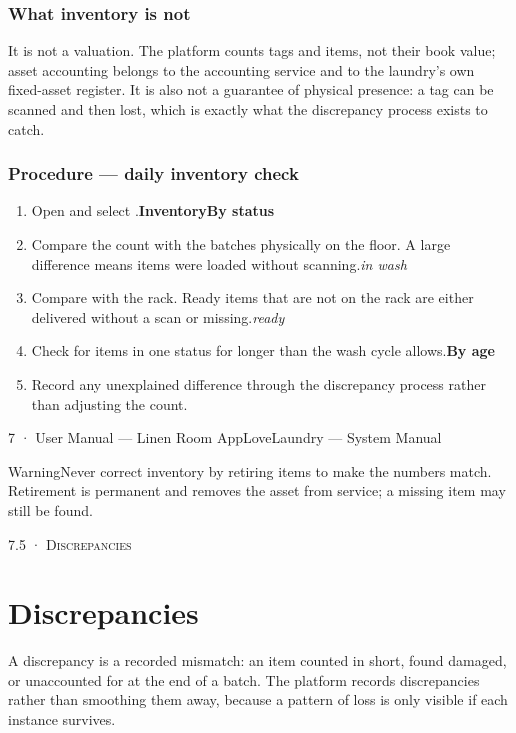 \documentclass[11pt,a4paper,oneside]{book}
\begin{document}
\subsubsection*{What inventory is not}
It is not a valuation. The platform counts tags and items, not their book value; asset accounting belongs to the accounting service and to the laundry's own fixed-asset register. It is also not a guarantee of physical presence: a tag can be scanned and then lost, which is exactly what the discrepancy process exists to catch.

\subsubsection*{Procedure — daily inventory check}
\begin{enumerate}
\item Open  and select .\textbf{Inventory}\textbf{By status}
\item Compare the  count with the batches physically on the floor. A large difference means items were loaded without scanning.\emph{in wash}
\item Compare  with the rack. Ready items that are not on the rack are either delivered without a scan or missing.\emph{ready}
\item Check  for items in one status for longer than the wash cycle allows.\textbf{By age}
\item Record any unexplained difference through the discrepancy process rather than adjusting the count.
\end{enumerate}
7 · User Manual — Linen Room AppLoveLaundry — System Manual

\begin{notebox}WarningNever correct inventory by retiring items to make the numbers match. Retirement is permanent and removes the asset from service; a missing item may still be found.\end{notebox}
\textsc{\small\color{crimson}7.5 · Discrepancies}\par\medskip
\section*{Discrepancies}
A discrepancy is a recorded mismatch: an item counted in short, found damaged, or unaccounted for at the end of a batch. The platform records discrepancies rather than smoothing them away, because a pattern of loss is only visible if each instance survives.
\end{document}
